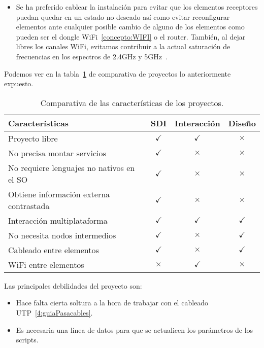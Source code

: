 \begin{itemize}
\item
    Se ha preferido cablear la instalación para evitar que los elementos receptores puedan quedar en un estado no deseado así como evitar reconfigurar elementos ante cualquier posible cambio de alguno de los elementos como pueden ser el dongle WiFi~\ref{concepto:WIFI} o el router.
    También, al dejar libres los canales WiFi, evitamos contribuir a la actual saturación de frecuencias en los espectros de 2.4GHz y 5GHz~\cite{manual:IEEE802.11}.

\end{itemize}


Podemos ver en la tabla~\ref{tabla:comparativa-proyectos} de comparativa de proyectos lo anteriormente expuesto.

\begin{itemize}
\tightlist
\end{itemize}
\begin{table}[H]
\centering
\begin{tabular}{lccc}
\toprule
Características & SDI & Interacción & Diseño  \\
\midrule
Proyecto libre                          & \cellcolor{green!25} {$\checkmark$} & \cellcolor{green!25} {$\checkmark$} & \cellcolor{red!25} {$\times$} \\
No precisa montar servicios             & \cellcolor{green!25} {$\checkmark$} & \cellcolor{red!25} {$\times$} & \cellcolor{red!25} {$\times$} \\
No requiere lenguajes no nativos en el SO  & \cellcolor{green!25} {$\checkmark$} & \cellcolor{red!25} {$\times$} & \cellcolor{red!25} {$\times$} \\
Obtiene información externa contrastada & \cellcolor{green!25} {$\checkmark$} & \cellcolor{red!25} {$\times$} & \cellcolor{red!25} {$\times$} \\
Interacción multiplataforma             & \cellcolor{green!25} {$\checkmark$} & \cellcolor{green!25} {$\checkmark$} & \cellcolor{green!25} {$\checkmark$} \\
No necesita nodos intermedios           & \cellcolor{green!25} {$\checkmark$} & \cellcolor{red!25} {$\times$} & \cellcolor{green!25} {$\checkmark$} \\
Cableado entre elementos                & \cellcolor{green!25} {$\checkmark$} & \cellcolor{red!25} {$\times$} & \cellcolor{green!25} {$\checkmark$} \\
WiFi entre elementos                    & \cellcolor{red!25} {$\times$} & \cellcolor{green!25} {$\checkmark$} & \cellcolor{red!25} {$\times$} \\
\bottomrule
\end{tabular}
\caption{Comparativa de las características de los proyectos.}
\label{tabla:comparativa-proyectos}
\end{table}

Las principales debilidades del proyecto son:

\begin{itemize}
\tightlist
\item
    Hace falta cierta soltura a la hora de trabajar con el cableado UTP~\ref{4:guiaPasacables}.
\item
    Es necesaria una línea de datos para que se actualicen los parámetros de los scripts.

\end{itemize}
